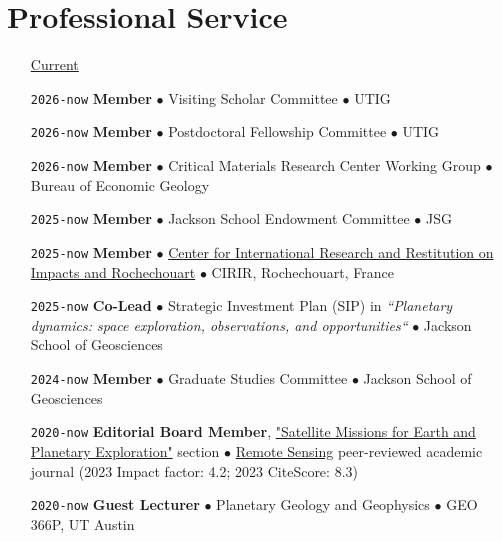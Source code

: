 \section*{Professional Service}

\begin{itemize}[leftmargin=5.8em, labelsep=1.5em]
    \setlength\itemsep{-.5em}

    \item[\ul{Current}] 

    \item[\texttt{2026-now}] \textbf{Member} $\bullet$ Visiting Scholar Committee $\bullet$ UTIG
    
    \item[\texttt{2026-now}] \textbf{Member} $\bullet$ Postdoctoral Fellowship Committee $\bullet$ UTIG
    
    \item[\texttt{2026-now}] \textbf{Member} $\bullet$ Critical Materials Research Center Working Group $\bullet$ Bureau of Economic Geology

    \item[\texttt{2025-now}] \textbf{Member} $\bullet$ Jackson School Endowment Committee  $\bullet$ JSG

    \item[\texttt{2025-now}] \textbf{Member} $\bullet$ \href{https://cirir-edu.org/en/}{Center for International Research and Restitution on Impacts and Rochechouart} $\bullet$ CIRIR, Rochechouart, France

    \item[\texttt{2025-now}] \textbf{Co-Lead} $\bullet$ Strategic Investment Plan (SIP) in \textit{“Planetary dynamics: space exploration, observations, and opportunities“} $\bullet$ Jackson School of Geosciences

    \item[\texttt{2024-now}] \textbf{Member} $\bullet$ Graduate Studies Committee $\bullet$ Jackson School of Geosciences
    
    \item[\texttt{2020-now}] \textbf{Editorial Board Member}, \href{https://www.mdpi.com/journal/remotesensing/sectioneditors/satellite_missions}{"Satellite Missions for Earth and Planetary Exploration"} section $\bullet$ \href{https://www.mdpi.com/journal/remotesensing}{Remote Sensing} peer-reviewed academic journal (2023 Impact factor: 4.2; 2023 CiteScore: 8.3)
    
    \item[\texttt{2020-now}] \textbf{Guest Lecturer} $\bullet$ Planetary Geology and Geophysics $\bullet$  GEO 366P, UT Austin
    

\end{itemize}
